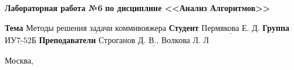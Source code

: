 \vspace{1cm}

\begin{center}
	\noindent\begin{minipage}{1.3\textwidth}\centering
		\Large\textbf{  Лабораторная работа №6}\newline
		\textbf{по дисциплине <<Анализ Алгоритмов>>}\newline\newline
	\end{minipage}
\end{center}

\noindent\textbf{Тема} $\underline{\text{Методы решения задачи коммивояжера}}$\newline\newline
\noindent\textbf{Студент} $\underline{\text{Пермякова Е. Д.}}$\newline\newline
\noindent\textbf{Группа} $\underline{\text{ИУ7-52Б}}$\newline\newline
\noindent\textbf{Преподаватели} $\underline{\text{Строганов Д. В., Волкова Л. Л}}$\newline

\begin{center}
	\vfill
	Москва,~\the\year
\end{center}
\clearpage
